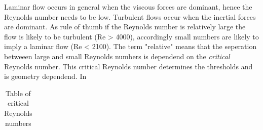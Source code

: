 Laminar flow occurs in general when the viscous forces are dominant, hence the Reynolds number needs to be low. Turbulent flows occur when the inertial forces are dominant. As rule of thumb if the Reynolds number is relatively large the flow is likely to be turbulent (Re > 4000), accordingly small numbers are likely to imply a laminar flow (Re < 2100).
The term "relative" means that the seperation betweeen large and small Reynolds numbers is dependend on the \emph{critical} Reynolds number. This critical Reynolds number determines the thresholds and is geometry dependend.
In 

\begin {table}[htp]
\begin{tabular}{lll}

\end{tabular}
\caption{Table of critical Reynolds numbers}
\end {table}